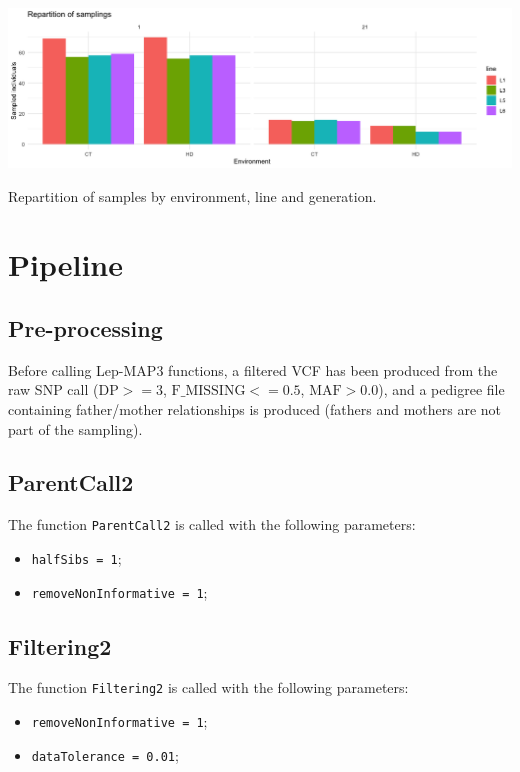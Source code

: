 \documentclass[english, a4paper, 12pt]{article}
\makeatletter
\newenvironment{figurehere}
{\def\@captype{figure}}
{}
\makeatother
\begin{document}
\hfill

\begin{figurehere}
\centering
\includegraphics[width=1\linewidth]{figure1_bis.png}
\caption{\small{Repartition of samples by environment, line and generation.}}
\end{figurehere}

\section{Pipeline}

\subsection{Pre-processing}

Before calling Lep-MAP3 functions, a filtered VCF has been produced from the raw SNP call ($\text{DP}>=3$, $\text{F\_MISSING}<=0.5$, $\text{MAF}>0.0$), and a pedigree file containing father/mother relationships is produced (fathers and mothers are not part of the sampling).

\subsection{ParentCall2}

The function \texttt{ParentCall2} is called with the following parameters:
\begin{itemize}
\item \texttt{halfSibs = 1};
\item \texttt{removeNonInformative = 1};
\end{itemize}

\subsection{Filtering2}

The function \texttt{Filtering2} is called with the following parameters:
\begin{itemize}
\item \texttt{removeNonInformative = 1};
\item \texttt{dataTolerance = 0.01};
\end{itemize}
\end{document}
